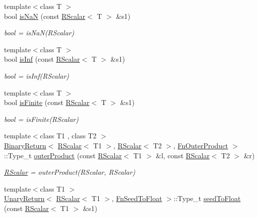 \begin{DoxyCompactItemize}
{\footnotesize template$<$class T $>$ }\\bool \mbox{\hyperlink{group__rscalar_ga831d3981e39b262a19f78641d8b770c3}{is\+NaN}} (const \mbox{\hyperlink{classENSEM_1_1RScalar}{R\+Scalar}}$<$ T $>$ \&s1)
\begin{DoxyCompactList}\small\item\em bool = is\+Na\+N(\+R\+Scalar) \end{DoxyCompactList}\item 
{\footnotesize template$<$class T $>$ }\\bool \mbox{\hyperlink{group__rscalar_ga01c23e87027a8c43440f812a0693b62f}{is\+Inf}} (const \mbox{\hyperlink{classENSEM_1_1RScalar}{R\+Scalar}}$<$ T $>$ \&s1)
\begin{DoxyCompactList}\small\item\em bool = is\+Inf(\+R\+Scalar) \end{DoxyCompactList}\item 
{\footnotesize template$<$class T $>$ }\\bool \mbox{\hyperlink{group__rscalar_ga7ec54fb1eaedacb87a42df35a5f11001}{is\+Finite}} (const \mbox{\hyperlink{classENSEM_1_1RScalar}{R\+Scalar}}$<$ T $>$ \&s1)
\begin{DoxyCompactList}\small\item\em bool = is\+Finite(\+R\+Scalar) \end{DoxyCompactList}\item 
{\footnotesize template$<$class T1 , class T2 $>$ }\\\mbox{\hyperlink{structENSEM_1_1BinaryReturn}{Binary\+Return}}$<$ \mbox{\hyperlink{classENSEM_1_1RScalar}{R\+Scalar}}$<$ T1 $>$, \mbox{\hyperlink{classENSEM_1_1RScalar}{R\+Scalar}}$<$ T2 $>$, \mbox{\hyperlink{structENSEM_1_1FnOuterProduct}{Fn\+Outer\+Product}} $>$\+::Type\+\_\+t \mbox{\hyperlink{group__rscalar_ga15f13b29160f342d113127c8d71db613}{outer\+Product}} (const \mbox{\hyperlink{classENSEM_1_1RScalar}{R\+Scalar}}$<$ T1 $>$ \&l, const \mbox{\hyperlink{classENSEM_1_1RScalar}{R\+Scalar}}$<$ T2 $>$ \&r)
\begin{DoxyCompactList}\small\item\em \mbox{\hyperlink{classENSEM_1_1RScalar}{R\+Scalar}} = outer\+Product(\+R\+Scalar, R\+Scalar) \end{DoxyCompactList}\item 
{\footnotesize template$<$class T1 $>$ }\\\mbox{\hyperlink{structENSEM_1_1UnaryReturn}{Unary\+Return}}$<$ \mbox{\hyperlink{classENSEM_1_1RScalar}{R\+Scalar}}$<$ T1 $>$, \mbox{\hyperlink{structENSEM_1_1FnSeedToFloat}{Fn\+Seed\+To\+Float}} $>$\+::Type\+\_\+t \mbox{\hyperlink{group__rscalar_gaaeb1321ab6946f99106e2a50f9098353}{seed\+To\+Float}} (const \mbox{\hyperlink{classENSEM_1_1RScalar}{R\+Scalar}}$<$ T1 $>$ \&s1)

\end{DoxyCompactItemize}
